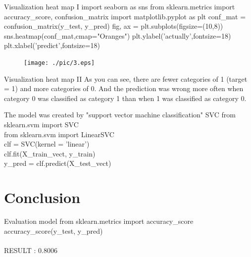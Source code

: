 \documentclass[
 size=14pt,
 paper=smartboard,  %
 mode=present, 		%
 display=slides, 	%
 style=tuliplab,  	%
 pauseslide,
 fleqn,leqno]{powerdot}
\begin{document}
\begin{slide}{Visualization heat map I}
import seaborn as sns 
from sklearn.metrics import accuracy\_score, confusion\_matrix 
import matplotlib.pyplot as plt 
conf\_mat = confusion\_matrix(y\_test, y\_pred) 
fig, ax = plt.subplots(figsize=(10,8)) 
sns.heatmap(conf\_mat,cmap="Oranges")  
plt.ylabel('actually',fontsize=18) 
plt.xlabel('predict',fontsize=18) 
\begin{center}
	\begin{figure}[htbp]
		\texttt{[image: ./pic/3.eps]}
	\end{figure}
\end{center}
	
\end{slide}
\begin{slide}{Visualization heat map II}
As you can see, there are fewer categories of 1 (target = 1) and more categories of 0. And the prediction was wrong more often when category 0 was classified as category 1 than when 1 was classified as category 0.
\end{slide}


\begin{slide}{The model was created by "support vector machine classification" SVC}
	from sklearn.svm import SVC\\
	from sklearn.svm import LinearSVC\\
	
	clf = SVC(kernel = 'linear')\\
	clf.fit(X\_train\_vect, y\_train)\\
	
	y\_pred = clf.predict(X\_test\_vect)\\
\end{slide}

\section{Conclusion}

\begin{slide}[toc=,bm=]{Evaluation model}
from sklearn.metrics import accuracy\_score\\
accuracy\_score(y\_test, y\_pred)\\
\\
RESULT : 0.8006\\
	
\end{slide}


\end{document}
